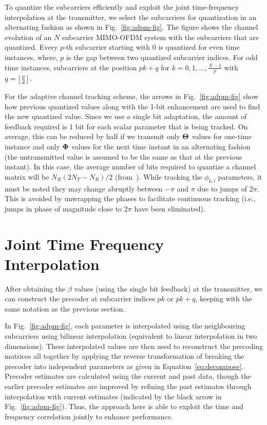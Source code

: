 \documentclass[11pt,a4paper]{report}
\DeclarePairedDelimiter\floor{\lfloor}{\rfloor}
\begin{document}
To quantize the subcarriers efficiently and exploit the joint
time-frequency interpolation at the transmitter, we select the
subcarriers for quantization in an alternating fashion as shown in
Fig.~\ref{fig:adpm-fig}. The figure shows the channel evolution of an
$N$ subcarrier MIMO-OFDM system with the subcarriers that are
quantized. Every $p$-th subcarrier starting with $0$ is quantized for
even time instances, where, $p$ is the gap between two quantized
subcarrier indices. For odd time instances, subcarriers at the
position $pk+q$ for $k = 0,1,..., \frac{N-1}{p}$ with $q =
{\floor*{\frac{p}{2}}}$.

For the adaptive channel tracking scheme, the arrows in
Fig.~\ref{fig:adpm-fig} show how previous quantized values along with
the 1-bit enhancement are used to find the new quantized value. Since
we use a single bit adaptation, the amount of feedback required is 1
bit for each scalar parameter that is being tracked. On average, this
can be reduced by half if we transmit only $\bf{\Theta}$ values for
one-time instance and only $\bf{\Phi}$ values for the next time
instant in an alternating fashion (the untransmitted value is assumed
to be the same as that at the previous instant). In this case, the
average number of bits required to quantize a channel matrix will be
$N_{R}(2N_{T} - N_R )/2$ (from~\cite{4114278}). While tracking
the $\phi_{k,l}$ parameters, it must be noted they may change abruptly
between $-\pi$ and $\pi$ due to jumps of $2\pi$. This is avoided by
unwrapping the phases to facilitate continuous tracking (i.e., jumps
in phase of magnitude close to $2\pi$ have been eliminated).

\section{Joint Time Frequency Interpolation}
\label{sec:interp}
After obtaining the $\beta$ values (using the single bit feedback) at
the transmitter, we can construct the precoder at subcarrier indices
$pk$ or $pk+q$, keeping with the same notation as the previous
section.

In Fig.~\ref{fig:adpm-fig}, each parameter is interpolated using the
neighbouring subcarriers using bilinear interpolation (equivalent to
linear interpolation in two dimensions). These interpolated values are
then used to reconstruct the precoding matrices all together by
applying the reverse transformation of breaking the precoder into
independent parameters as given in
Equation~\ref{eq:decompose}. Precoder estimates are calculated using
the current and past data, though the earlier precoder estimates
are improved by refining the past estimates through
interpolation with current estimates (indicated by the black arrow in
Fig.~\ref{fig:adpm-fig}). Thus, the approach here is able to exploit
the time and frequency correlation jointly to enhance performance.
\end{document}
